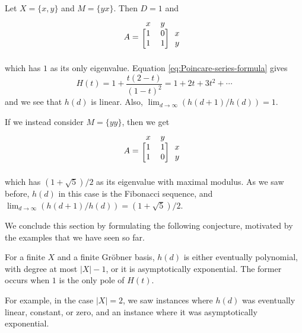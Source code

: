 \begin{example}
	Let $X = \{x,y\}$ and $M = \{yx\}$. Then $D = 1$ and
	\[
		A = 
		\begin{blockarray}{ccc}
		x & y &\\
		\begin{block}{[cc]c}
		1 & 0 & x\\
		1 & 1 & y\\
		\end{block}
		\end{blockarray}
	\]
	which has $1$ as its only eigenvalue. Equation \eqref{eq:Poincare-series-formula} gives
	\[
		H(t) = 1 + \frac{t(2-t)}{(1-t)^2} = 1 + 2t + 3t^2 + \cdots
	\]
	and we see that $h(d)$ is linear. Also, $\lim_{d\to \infty} (h(d+1)/h(d)) = 1$.
	
	If we instead consider $M = \{yy\}$, then we get
	\[
		A = 
		\begin{blockarray}{ccc}
		x & y &\\
		\begin{block}{[cc]c}
		1 & 1 & x\\
		1 & 0 & y\\
		\end{block}
		\end{blockarray}
	\]
	which has $(1+\sqrt{5})/2$ as its eigenvalue with maximal modulus. As we saw before, $h(d)$ in this case is the Fibonacci sequence, and $\lim_{d\to \infty} (h(d+1) / h(d)) = (1+\sqrt{5})/2$.
\end{example}

We conclude this section by formulating the following conjecture, motivated by the examples that we have seen so far.
\begin{conj}
	For a finite $X$ and a finite Gr\"obner basis, $h(d)$ is either eventually polynomial, with degree at most $|X| - 1$, or it is asymptotically exponential. The former occurs when $1$ is the only pole of $H(t)$.
\end{conj}
For example, in the case $|X|=2$, we saw instances where $h(d)$ was eventually linear, constant, or zero, and an instance where it was asymptotically exponential.
